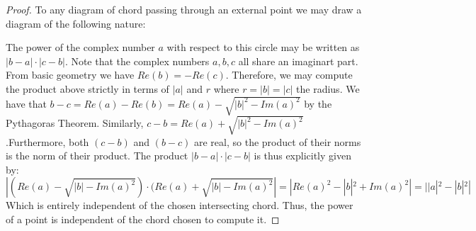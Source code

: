 \documentclass{article}
\begin{document}
\begin{proof}
To any diagram of chord passing through an external point we may draw a diagram of the following nature:

\begin{center}
\end{center}

The power of the complex number $a$ with respect to this circle may be written as $|b-a|\cdot|c-b|$. Note that the complex numbers $a,b,c$ all share an imaginart part. From basic geometry we have $Re(b) = -Re(c)$. Therefore, we may compute the product above strictly in terms of $|a|$ and $r$ where $r = |b| = |c|$ the radius. We have that $b-c = Re(a) - Re(b) = Re(a) - \sqrt{|b|^{2} - Im(a)^{2}}$ by the Pythagoras Theorem. Similarly, $c-b = Re(a) + \sqrt{|b|^{2} - Im(a)^{2}}$.Furthermore, both $(c-b)$ and $(b-c)$ are real, so the product of their norms is the norm of their product. The product $|b-a|\cdot|c-b|$ is thus explicitly given by:
\[
  |(Re(a) - \sqrt{|b| - Im(a)^{2}})\cdot (Re(a) + \sqrt{|b| - Im(a)^{2}}| = |Re(a)^{2} - |b|^{2} + Im(a)^{2}| = ||a|^{2}-|b|^{2}|
\]
Which is entirely independent of the chosen intersecting chord. Thus, the power of a point is independent of the chord chosen to compute it.
\end{proof}
\end{document}
